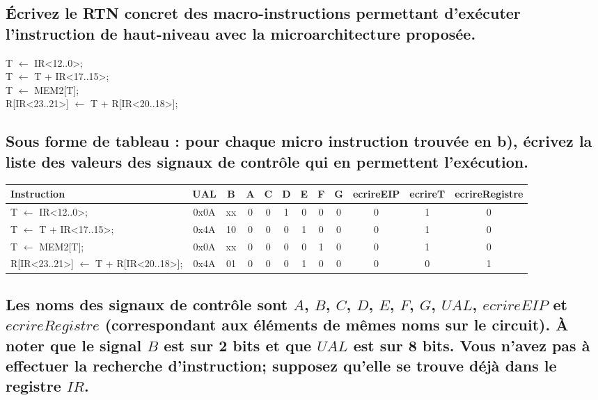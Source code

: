 \documentclass[10pt,letterpaper]{article}
\begin{document}
\subsection{Écrivez le RTN concret des macro-instructions permettant d'exécuter l'instruction de haut-niveau avec la microarchitecture proposée.}
\noindent
T $\gets$ IR<12..0>; \\
T $\gets$ T + IR<17..15>; \\
T $\gets$ MEM2[T]; \\
R[IR<23..21>] $\gets$ T + R[IR<20..18>];
\medskip

\subsection{Sous forme de tableau : pour chaque micro instruction trouvée en b), écrivez la liste des valeurs des signaux de contrôle qui en permettent l'exécution.}
\begin{tabular}{| l | c c | c c c c c c c c c |}
\hline
Instruction & UAL & B & A & C & D & E & F & G & ecrireEIP & ecrireT & ecrireRegistre \\
\hline
T $\gets$ IR<12..0>; & 0x0A & xx & 0 & 0 & 1 & 0 & 0 & 0 & 0 & 1 & 0 \\
T $\gets$ T + IR<17..15>; & 0x4A & 10 & 0 & 0 & 0 & 1 & 0 & 0 & 0 & 1 & 0 \\
T $\gets$ MEM2[T]; & 0x0A & xx & 0 & 0 & 0 & 0 & 1 & 0 & 0 & 1 & 0 \\
R[IR<23..21>] $\gets$ T + R[IR<20..18>]; & 0x4A & 01 & 0 & 0 & 0 & 1 & 0 & 0 & 0 & 0 & 1 \\
\hline
\end{tabular}
\medskip

\subsection{Les noms des signaux de contrôle sont $A$, $B$, $C$, $D$, $E$, $F$, $G$, $UAL$, $ecrireEIP$ et $ecrireRegistre$ (correspondant aux éléments de mêmes noms sur le circuit). À noter que le signal $B$ est sur 2 bits et que $UAL$ est sur 8 bits. Vous n'avez pas à effectuer la recherche d'instruction; supposez qu'elle se trouve déjà dans le registre $IR$.}
\medskip
\end{document}
